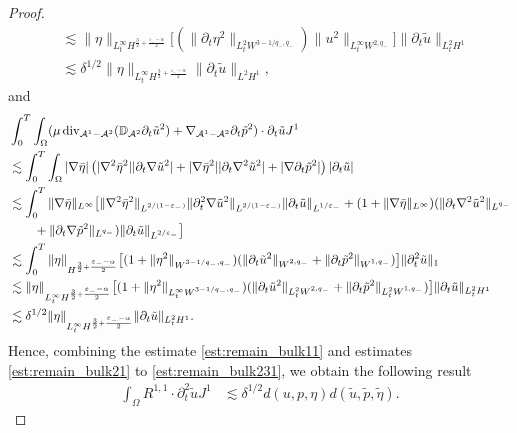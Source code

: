\documentclass[letterpaper,reqno,10pt,twoside]{amsart}
\theoremstyle{definition}
\theoremstyle{remark}
\def\p{\partial}
\def\Om{\Omega}
\def\dive{\mathop{\rm div}\nolimits}
\begin{document}
\begin{proof}
\begin{equation}
\begin{aligned}
					&\lesssim \|\eta\|_{L_{t}^{\infty}H^{\frac{3}{2}+\frac{\varepsilon_{-}-\alpha}{2}}}\big[(\|\p_{t}\eta^2\|_{L_{t}^{2}W^{3-1/q_-,q_-}})\|{u}^{2}\|_{L_{t}^{\infty}W^{2,q_-}}\big]\|\p_t\tilde{u}\|_{L_{t}^{2}H^{1}}\\
					&\lesssim\delta^{1/2}\|\eta\|_{L_{t}^{\infty}H^{\frac{3}{2}+\frac{\varepsilon_{-}-\alpha}{2}}}\|\p_t\tilde{u}\|_{L^2H^1},
				\end{aligned}
			\end{equation}
			and
			\begin{equation}\label{est:remain_bulk231}
				\begin{aligned}
					&\int_0^T\int_\Om (\mu\dive_{\mathcal{A}^1-\mathcal{A}^{2}}(\mathbb{D}_{\mathcal{A}^2}\p_{t}\tilde{u}^{2})+\nabla_{\mathcal{A}^{1}-\mathcal{A}^{2}}\p_{t}\tilde{p}^{2})\cdot\p_t\tilde{u}J^1\\
					&\lesssim\int_0^T\int_\Om |\nabla\bar{\eta}|\left(|\nabla^2\bar{\eta}^2||\p_{t}\nabla\tilde{u}^{2}|+|\nabla\bar{\eta}^{2}||\p_{t}\nabla^2\tilde{u}^{2}|+|\nabla\p_{t}\tilde{p}^{2}|\right)|\p_t\tilde{u}|\\
					&\lesssim\int_0^T\|\nabla\bar{\eta}\|_{L^{\infty}}\big[\|\nabla^2\bar{\eta}^2\|_{L^{2/(1-\varepsilon_-)}}\|\p_{t}^{2}\nabla\tilde{u}^{2}\|_{L^{2/(1-\varepsilon_-)}}\|\p_t\tilde{u}\|_{L^{1/\varepsilon_-}}+(1+\|\nabla\bar{\eta}\|_{L^{\infty}})(\|\p_{t}\nabla^2\tilde{u}^{2}\|_{L^{q_-}}\\
					&\qquad+\|\p_{t}\nabla\tilde{p}^{2}\|_{L^{q_{-}}})\|\p_t\tilde{u}\|_{L^{2/\varepsilon_-}}\big]\\
					&\lesssim\int_0^T\|\eta\|_{H^{\frac{3}{2}+\frac{\varepsilon_{-}-\alpha}{2}}}\big[(1+\|\eta^2\|_{W^{3-1/q_-,q_-}})(\|\p_{t}\tilde{u}^{2}\|_{W^{2,q_-}}+\|\p_{t}\tilde{p}^{2}\|_{W^{1,q_{-}}})\big]\|\p_t^2\tilde{u}\|_{1}\\
					&\lesssim \|\eta\|_{L_{t}^{\infty}H^{\frac{3}{2}+\frac{\varepsilon_{-}-\alpha}{2}}}\big[(1+\|\eta^2\|_{L_{t}^{\infty}W^{3-1/q_-,q_-}})(\|\p_{t}\tilde{u}^{2}\|_{L_{t}^{2}W^{2,q_-}}+\|\p_{t}\tilde{p}^{2}\|_{L_{t}^{2}W^{1,q_{-}}})\big]\|\p_t\tilde{u}\|_{L_{t}^{2}H^{1}}\\
					&\lesssim\delta^{1/2}\|\eta\|_{L_{t}^{\infty}H^{\frac{3}{2}+\frac{\varepsilon_{-}-\alpha}{2}}}\|\p_t\tilde{u}\|_{L_{t}^2H^1}.
				\end{aligned}
			\end{equation}
			Hence, combining the estimate \eqref{est:remain_bulk11} and estimates \eqref{est:remain_bulk21} to  \eqref{est:remain_bulk231}, we obtain the following result
			\begin{equation}\label{est:remain_bulk2}
				\begin{aligned}
					\int_\Om R^{1,1}\cdot\p_t^{2}\tilde{u}J^1
					&\lesssim \delta^{1/2}d(u,p,\eta)d(\tilde{u},\tilde{p},\tilde{\eta}).
				\end{aligned}
			\end{equation}
			

\end{proof}
\end{document}

